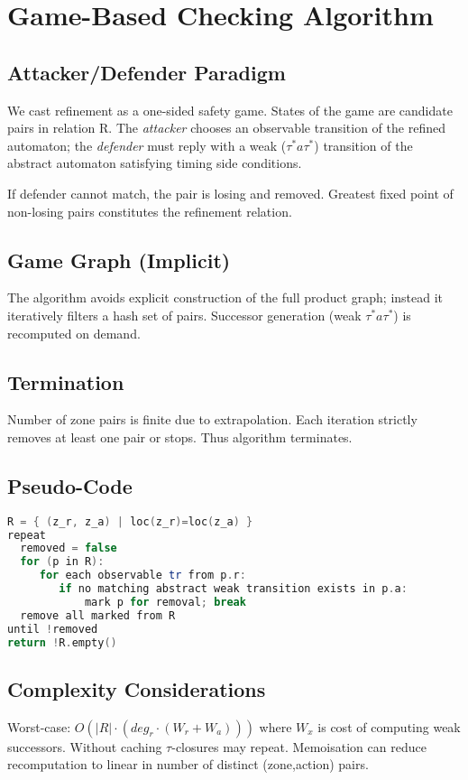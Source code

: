 \section{Game-Based Checking Algorithm}
\subsection{Attacker/Defender Paradigm}
We cast refinement as a one-sided safety game. States of the game are candidate pairs in relation R. The \emph{attacker} chooses an observable transition of the refined automaton; the \emph{defender} must reply with a weak ($\tau^* a \tau^*$) transition of the abstract automaton satisfying timing side conditions.

If defender cannot match, the pair is losing and removed. Greatest fixed point of non-losing pairs constitutes the refinement relation.

\subsection{Game Graph (Implicit)}
The algorithm avoids explicit construction of the full product graph; instead it iteratively filters a hash set of pairs. Successor generation (weak $\tau^* a \tau^*$) is recomputed on demand.

\subsection{Termination}
Number of zone pairs is finite due to extrapolation. Each iteration strictly removes at least one pair or stops. Thus algorithm terminates.

\subsection{Pseudo-Code}
\begin{lstlisting}[language=C++]
R = { (z_r, z_a) | loc(z_r)=loc(z_a) }
repeat
  removed = false
  for (p in R):
     for each observable tr from p.r:
        if no matching abstract weak transition exists in p.a:
            mark p for removal; break
  remove all marked from R
until !removed
return !R.empty()
\end{lstlisting}

\subsection{Complexity Considerations}
Worst-case: $O(|R| \cdot (deg_r \cdot (W_r + W_a)))$ where $W_x$ is cost of computing weak successors. Without caching $\tau$-closures may repeat. Memoisation can reduce recomputation to linear in number of distinct (zone,action) pairs.

